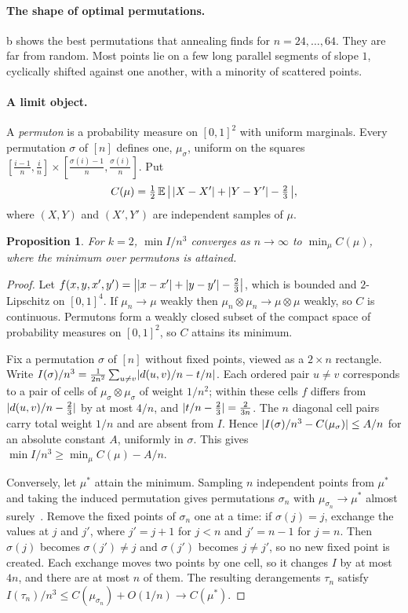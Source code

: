 \documentclass[11pt]{article}
\theoremstyle{plain}
\newtheorem{proposition}[theorem]{Proposition}
\theoremstyle{definition}
\theoremstyle{remark}
\DeclarePairedDelimiter{\abs}{\lvert}{\rvert}
\begin{document}
\paragraph{The shape of optimal permutations.} b shows the best permutations
that annealing finds for $n=24,\dots,64$. They are far from random. Most points lie on a few
long parallel segments of slope $1$, cyclically shifted against one another, with a minority of
scattered points.

\paragraph{A limit object.} A \emph{permuton} is a probability measure on $[0,1]^2$ with
uniform marginals. Every permutation $\sigma$ of $[n]$ defines one, $\mu_\sigma$, uniform on
the squares $[\frac{i-1}n,\frac in]\times[\frac{\sigma(i)-1}n,\frac{\sigma(i)}n]$. Put
\[
  C(\mu)=\tfrac12\,\mathbb E\,\bigl|\,\abs{X-X'}+\abs{Y-Y'}-\tfrac23\,\bigr|,
\]
where $(X,Y)$ and $(X',Y')$ are independent samples of $\mu$.

\begin{proposition}\label{prop:limit}
For $k=2$, $\min I/n^3$ converges as $n\to\infty$ to $\min_\mu C(\mu)$, where the minimum over
permutons is attained.
\end{proposition}

\begin{proof}
Let $f(x,y,x',y')=\bigl|\abs{x-x'}+\abs{y-y'}-\frac23\bigr|$, which is bounded and $2$-Lipschitz
on $[0,1]^4$. If $\mu_n\to\mu$ weakly then $\mu_n\otimes\mu_n\to\mu\otimes\mu$ weakly, so $C$ is
continuous. Permutons form a weakly closed subset of the compact space of probability measures on
$[0,1]^2$, so $C$ attains its minimum.

Fix a permutation $\sigma$ of $[n]$ without fixed points, viewed as a $2\times n$ rectangle. Write
$I(\sigma)/n^3=\frac1{2n^2}\sum_{u\ne v}\abs{d(u,v)/n-t/n}$. Each ordered pair $u\ne v$ corresponds to
a pair of cells of $\mu_\sigma\otimes\mu_\sigma$ of weight $1/n^2$; within these cells $f$ differs
from $\abs{d(u,v)/n-\frac23}$ by at most $4/n$, and $\abs{t/n-\frac23}=\frac2{3n}$. The $n$
diagonal cell pairs carry total weight $1/n$ and are absent from $I$. Hence
$\abs{I(\sigma)/n^3-C(\mu_\sigma)}\le A/n$ for an absolute constant $A$, uniformly in $\sigma$.
This gives $\min I/n^3\ge\min_\mu C(\mu)-A/n$.

Conversely, let $\mu^\ast$ attain the minimum. Sampling $n$ independent points from $\mu^\ast$ and
taking the induced permutation gives permutations $\sigma_n$ with $\mu_{\sigma_n}\to\mu^\ast$
almost surely~\citep{HoppenEtAl2013}. Remove the fixed points of $\sigma_n$ one at a time: if
$\sigma(j)=j$, exchange the values at $j$ and $j'$, where $j'=j+1$ for $j<n$ and $j'=n-1$ for
$j=n$. Then $\sigma(j)$ becomes $\sigma(j')\ne j$ and $\sigma(j')$ becomes $j\ne j'$, so no new
fixed point is created. Each exchange moves two points by one cell, so it changes $I$ by at most
$4n$, and there are at most $n$ of them. The resulting derangements $\tau_n$ satisfy
$I(\tau_n)/n^3\le C(\mu_{\sigma_n})+O(1/n)\to C(\mu^\ast)$.
\end{proof}
\end{document}
